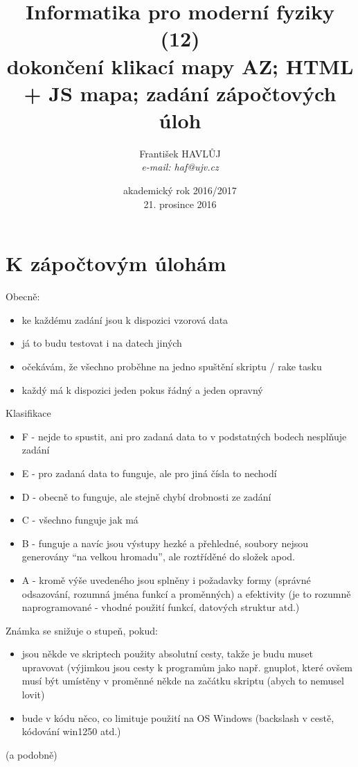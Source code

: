 \documentclass{beamer}
\title[IMF (11)]{Informatika pro moderní fyziky (12)\\ dokončení klikací mapy AZ; HTML + JS mapa; zadání zápočtových úloh}
\author[Franti\v{s}ek HAVL\r{U}J, ORF ÚJV Řež]{Franti\v{s}ek HAVL\r{U}J\\{\scriptsize \emph{e-mail: haf@ujv.cz}}}
\date{akademický rok 2016/2017\\21. prosince 2016}
\institute[ORF ÚJV Řež]
{ÚJV Řež\\oddělení Reaktorové fyziky a podpory palivového cyklu}
\begin{document}
\begin{frame}
  \titlepage
\end{frame}

\begin{frame}
  \tableofcontents
\end{frame}

\section{K zápočtovým úlohám}

\begin{frame}{Obecně:}
\begin{itemize}
  \item ke každému zadání jsou k dispozici vzorová data
  \item já to budu testovat i na datech jiných
  \item očekávám, že všechno proběhne na jedno spuštění skriptu / rake tasku
  \item každý má k dispozici jeden pokus řádný a jeden opravný
\end{itemize}
\end{frame}

\begin{frame}{Klasifikace}
  \begin{itemize}
    \item F - nejde to spustit, ani pro zadaná data to v podstatných bodech nesplňuje zadání
    \item E - pro zadaná data to funguje, ale pro jiná čísla to nechodí
    \item D - obecně to funguje, ale stejně chybí drobnosti ze zadání
    \item C - všechno funguje jak má
    \item B - funguje a navíc jsou výstupy hezké a přehledné, soubory nejsou generovány “na velkou hromadu”, ale roztříděné do složek apod.
    \item A - kromě výše uvedeného jsou splněny i požadavky formy (správné odsazování, rozumná jména funkcí a proměnných) a efektivity (je to rozumně naprogramované - vhodné použití funkcí, datových struktur atd.)
  \end{itemize}
\end{frame}

\begin{frame}{Známka se snižuje o stupeň, pokud:}
  \begin{itemize}
    \item jsou někde ve skriptech použity absolutní cesty, takže je budu muset upravovat (výjimkou jsou cesty k programům jako např. gnuplot, které ovšem musí být umístěny v proměnné někde na začátku skriptu (abych to nemusel lovit)
    \item bude v kódu něco, co limituje použití na OS Windows (backslash v cestě, kódování win1250 atd.)
  \end{itemize}
  (a podobně)
\end{frame}
\end{document}
